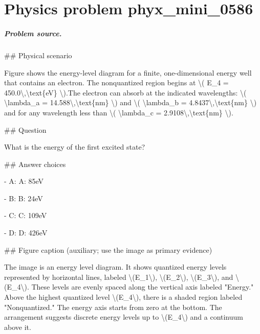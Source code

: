 
\chapter{Physics problem phyx\_mini\_0586}
\label{ch:PhyXMiniProblems_problem_phyx_mini_0586}

\paragraph{Problem source.}
\#\# Physical scenario

Figure shows the energy-level diagram for a finite, one-dimensional energy well that contains an electron. The nonquantized region begins at \textbackslash{}( E\_4 = 450.0\textbackslash{},\textbackslash{}text\{eV\} \textbackslash{}).The electron can absorb at the indicated wavelengths: \textbackslash{}( \textbackslash{}lambda\_a = 14.588\textbackslash{},\textbackslash{}text\{nm\} \textbackslash{}) and \textbackslash{}( \textbackslash{}lambda\_b = 4.8437\textbackslash{},\textbackslash{}text\{nm\} \textbackslash{}) and for any wavelength less than \textbackslash{}( \textbackslash{}lambda\_c = 2.9108\textbackslash{},\textbackslash{}text\{nm\} \textbackslash{}).

\#\# Question

What is the energy of the first excited state?

\#\# Answer choices

- A: A: 85eV

- B: B: 24eV

- C: C: 109eV

- D: D: 426eV

\#\# Figure caption (auxiliary; use the image as primary evidence)

The image is an energy level diagram. It shows quantized energy levels represented by horizontal lines, labeled \textbackslash{}(E\_1\textbackslash{}), \textbackslash{}(E\_2\textbackslash{}), \textbackslash{}(E\_3\textbackslash{}), and \textbackslash{}(E\_4\textbackslash{}). These levels are evenly spaced along the vertical axis labeled "Energy." Above the highest quantized level \textbackslash{}(E\_4\textbackslash{}), there is a shaded region labeled "Nonquantized." The energy axis starts from zero at the bottom. The arrangement suggests discrete energy levels up to \textbackslash{}(E\_4\textbackslash{}) and a continuum above it.

